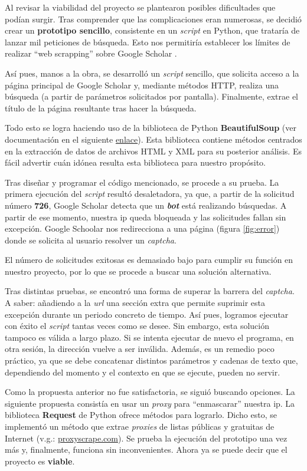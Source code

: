 
Al revisar la viabilidad del proyecto se plantearon posibles dificultades que podían surgir. Tras comprender que las complicaciones eran numerosas, se decidió crear un \textbf{prototipo sencillo}, consistente en un \textit{script} en Python, que trataría de lanzar  mil peticiones de búsqueda. Esto nos permitiría establecer los límites de realizar ``web scrapping'' sobre Google Scholar .

Así pues, manos a la obra, se desarrolló un \textit{script} sencillo, que solicita acceso a la página principal de Google Scholar y, mediante métodos HTTP, realiza una búsqueda (a partir de parámetros solicitados por pantalla). Finalmente, extrae el título de la página resultante tras hacer la búsqueda. 

Todo esto se logra haciendo uso de la biblioteca de Python \textbf{BeautifulSoup} (ver documentación en el siguiente \href{https://beautiful-soup-4.readthedocs.io/en/latest/}{enlace}). Esta biblioteca contiene métodos centrados en la extracción de datos de archivos HTML y XML para su posterior análisis. Es fácil advertir cuán idónea resulta esta biblioteca para nuestro propósito.

Tras diseñar y programar el código mencionado, se procede a su prueba. La primera ejecución del \textit{script} resultó desaletadora, ya que, a partir de la solicitud número \textbf{726}, Google Scholar detecta que un \textbf{\textit{bot}} está realizando búsquedas. A partir de ese momento, nuestra ip queda bloqueada y las solicitudes fallan sin excepción. Google Schoolar nos redirecciona a una página (figura \ref{fig:error}) donde se solicita al usuario resolver un \textit{captcha}. 


El número de solicitudes exitosas es demasiado bajo para cumplir su función en nuestro proyecto, por lo que se procede a buscar una solución alternativa. 

Tras distintas pruebas, se encontró una forma de superar la barrera del \textit{captcha}. A saber: añadiendo a la \textit{url} una sección extra que permite suprimir esta excepción durante un periodo concreto de tiempo. Así pues, logramos ejecutar con éxito el \textit{script} tantas veces como se desee. Sin embargo, esta solución tampoco es válida a largo plazo. Si se intenta ejecutar de nuevo el programa, en otra sesión, la dirección vuelve a ser inválida. Además, es un remedio poco práctico, ya que se debe concatenar distintos parámetros y cadenas de texto que, dependiendo del momento y el contexto en que se ejecute, pueden no servir.

Como la propuesta anterior no fue satisfactoria, se siguió buscando opciones. La siguiente propuesta consistía en usar un \textit{proxy} para ``enmascarar'' nuestra ip. La biblioteca \textbf{Request} de Python ofrece métodos para lograrlo. Dicho esto, se implementó un método que extrae \textit{proxies} de listas públicas y gratuitas de Internet (v.g.: \href{https://www.proxyscrape.com/free-proxy-list}{proxyscrape.com}). Se prueba la ejecución del prototipo una vez más y, finalmente, funciona sin inconvenientes. Ahora ya se puede decir que el proyecto es \textbf{viable}.
